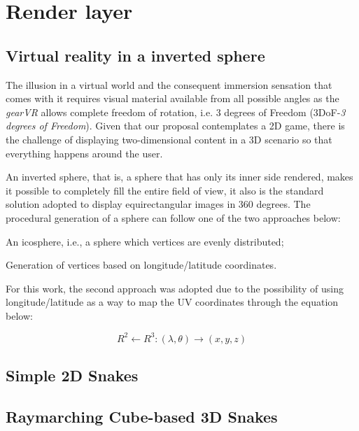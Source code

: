 \documentclass[runningheads]{llncs}
\begin{document}
\section{Render layer}

\subsection{Virtual reality in a inverted sphere}
The illusion in a virtual world and the consequent immersion sensation that comes with it requires visual material available from all possible angles as the \textit{gearVR} allows complete freedom of rotation, i.e. 3 degrees of Freedom (3DoF-\textit{3 degrees of Freedom}). Given that our proposal contemplates a 2D game, there is the challenge of displaying two-dimensional content in a 3D scenario so that everything happens around the user.

An inverted sphere, that is, a sphere that has only its inner side rendered, makes it possible to completely fill the entire field of view, it also is the standard solution adopted to display equirectangular images in 360 degrees. The procedural generation of a sphere can follow one of the two approaches below:

\begin{enumerate}
  \begin{item} An icosphere, i.e., a sphere which vertices are evenly distributed;
 \end{item}
  \begin{item} Generation of vertices based on longitude/latitude coordinates. \end{item}
\end{enumerate}

For this work, the second approach was adopted due to the possibility of using longitude/latitude as a way to map the UV coordinates through the equation below:

\begin{equation}
R^2 \leftarrow R^3 : (\lambda, \theta) \rightarrow (x, y, z)
\label{equation1}
\end{equation}

\subsection{Simple 2D Snakes}

\subsection{Raymarching Cube-based 3D Snakes}
\end{document}
